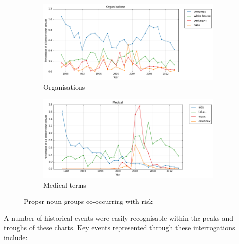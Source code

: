 \begin{figure}
                  \medskip
                  \begin{subfigure}{0.48\textwidth}
                  \includegraphics[width=\linewidth]{../images/orgs}
                  \caption{Organisations} \label{fig:e}
                  \end{subfigure}\hspace*{\fill}
                  \begin{subfigure}{0.48\textwidth}
                  \includegraphics[width=\linewidth]{../images/med}
                  \caption{Medical terms} \label{fig:f}
                  \end{subfigure}

                  \caption{Proper noun groups co-occurring with risk} \label{fig:propernouns}
                  \end{figure}

                A number of historical events were easily recognisable within the peaks and troughs of these charts. Key events represented through these interrogations include:

